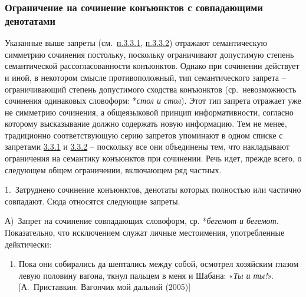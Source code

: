 \hypertarget{ux43eux433ux440ux430ux43dux438ux447ux435ux43dux438ux435-ux43dux430-ux441ux43eux447ux438ux43dux435ux43dux438ux435-ux43aux43eux43dux44aux44eux43dux43aux442ux43eux432-ux441-ux441ux43eux432ux43fux430ux434ux430ux44eux449ux438ux43cux438-ux434ux435ux43dux43eux442ux430ux442ux430ux43cux438}{%
\subsubsection{Ограничение на сочинение конъюнктов с совпадающими
денотатами}\label{ux43eux433ux440ux430ux43dux438ux447ux435ux43dux438ux435-ux43dux430-ux441ux43eux447ux438ux43dux435ux43dux438ux435-ux43aux43eux43dux44aux44eux43dux43aux442ux43eux432-ux441-ux441ux43eux432ux43fux430ux434ux430ux44eux449ux438ux43cux438-ux434ux435ux43dux43eux442ux430ux442ux430ux43cux438}}

Указанные выше запреты (см.~\underline{п.3.3.1}, \underline{п.3.3.2})
отражают семантическую симметрию сочинения постольку, поскольку
ограничивают допустимую степень семантической рассогласованности
конъюнктов. Однако при сочинении действует и иной, в некотором смысле
противоположный, тип семантического запрета -- ограничивающий степень
допустимого сходства конъюнктов (ср.~невозможность сочинения одинаковых
словоформ: *\emph{стол и стол}). Этот тип запрета отражает уже не
симметрию сочинения, а общеязыковой принцип информативности, согласно
которому высказывание должно содержать новую информацию. Тем не менее,
традиционно соответствующую серию запретов упоминают в одном списке с
запретами \underline{3.3.1} и \underline{3.3.2} -- поскольку все они
объединены тем, что накладывают ограничения на семантику конъюнктов при
сочинении. Речь идет, прежде всего, о следующем общем ограничении,
включающем ряд частных.

1.~Затруднено сочинение конъюнктов, денотаты которых полностью или
частично совпадают. Сюда относятся следующие запреты.

А)~Запрет на сочинение совпадающих словоформ, ср. *\emph{бегемот и
бегемот}. Показательно, что исключением служат личные местоимения,
употребленные дейктически:

\begin{enumerate}
\def\labelenumi{(\arabic{enumi})}
\setcounter{enumi}{17}
\item
  Пока они собирались да шептались между собой, осмотрел хозяйским
  глазом левую половину вагона, ткнул пальцем в меня и Шабана: «\emph{Ты
  и ты!}». {[}А.~Приставкин. Вагончик мой дальний (2005){]}
\end{enumerate}


